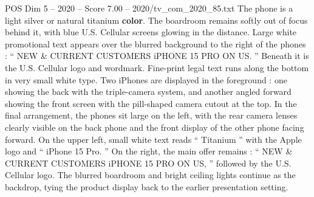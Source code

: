 \begin{textsample}{POS Dim 5 – 2020 – Score 7.00 – 2020/tv\_com\_2020\_85.txt}
The phone is a light silver or natural titanium \textbf{color}.
The boardroom remains softly out of focus behind it, with blue U.S.
Cellular screens glowing in the distance.
Large white promotional text appears over the blurred background to the right of the phones : “ NEW \& CURRENT CUSTOMERS iPHONE 15 PRO ON US. ” Beneath it is the U.S.
Cellular logo and wordmark.
Fine-print legal text runs along the bottom in very small white type.
Two iPhones are displayed in the foreground : one showing the back with the triple-camera system, and another angled forward showing the front screen with the pill-shaped camera cutout at the top.
In the final arrangement, the phones sit large on the left, with the rear camera lenses clearly visible on the back phone and the front display of the other phone facing forward.
On the upper left, small white text reads “ Titanium ” with the Apple logo and “ iPhone 15 Pro. ” On the right, the main offer remains : “ NEW \& CURRENT CUSTOMERS iPHONE 15 PRO ON US, ” followed by the U.S.
Cellular logo.
The blurred boardroom and bright ceiling lights continue as the backdrop, tying the product display back to the earlier presentation setting.

\end{textsample}
